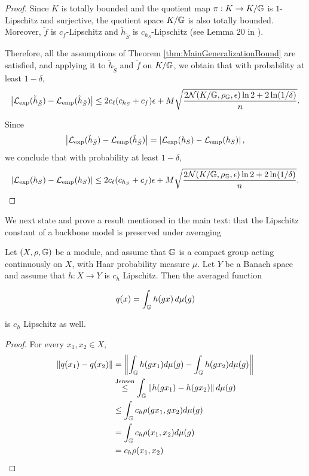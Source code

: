 \begin{proof}
Since $K$ is totally bounded and the quotient map
$\pi:K\to K/\mathbb{G}$ is $1$-Lipschitz and surjective, the quotient space
$K/\mathbb{G}$ is also totally bounded. Moreover, $\tilde{f}$ is
$c_f$-Lipschitz and $\tilde{h}_{\tilde S}$ is
$c_{h_S}$-Lipschitz (see Lemma 20 in
\cite{siegel2026quantitativeapproximationratesgroup}).

Therefore, all the assumptions of Theorem
\ref{thm:MainGeneralizationBound} are satisfied, and applying it to
$\tilde{h}_{\tilde S}$ and $\tilde{f}$ on $K/\mathbb{G}$, we obtain that with
probability at least $1-\delta$,
\begin{align*}
\left|
\mathcal{L}_{\mathrm{exp}}(\tilde{h}_{\tilde S})
-
\mathcal{L}_{\mathrm{emp}}(\tilde{h}_{\tilde S})
\right|
\leq
2c_\ell(c_{h_S}+c_f)\epsilon
+
M\sqrt{
\frac{
2\mathcal{N}(K/\mathbb{G},\rho_{\mathbb{G}},\epsilon)\ln 2
+
2\ln(1/\delta)
}{n}
}.
\end{align*}

Since
\[
\left|
\mathcal{L}_{\mathrm{exp}}(\tilde{h}_{\tilde S})
-
\mathcal{L}_{\mathrm{emp}}(\tilde{h}_{\tilde S})
\right|
=
\left|
\mathcal{L}_{\mathrm{exp}}(h_S)
-
\mathcal{L}_{\mathrm{emp}}(h_S)
\right|,
\]
we conclude that with probability at least $1-\delta$,
\begin{align*}
\left|
\mathcal{L}_{\mathrm{exp}}(h_S)
-
\mathcal{L}_{\mathrm{emp}}(h_S)
\right|
\leq
2c_\ell(c_{h_S}+c_f)\epsilon
+
M\sqrt{
\frac{
2\mathcal{N}(K/\mathbb{G},\rho_{\mathbb{G}},\epsilon)\ln 2
+
2\ln(1/\delta)
}{n}
}.
\end{align*}


\end{proof}


We next state and prove a result mentioned in the main text: that the Lipschitz constant of a backbone model is preserved under averaging
\begin{proposition}
\label{prop:Lavg}
Let $(X,\rho,\mathbb{G})$ be a module, and assume that $\mathbb{G}$ is a compact group acting continuously on $X$, with Haar probability measure $\mu$. Let $Y$ be a Banach space and assume that $h:X\to Y$ is $c_h$ Lipschitz. Then the averaged function

$$
q(x)=\int_{\mathbb{G}} h(gx)\,d\mu(g)
$$

is $c_h$ Lipschitz as well.
\end{proposition}

\begin{proof}
For every $x_1,x_2\in X$,
\begin{align*}
\|q(x_1)-q(x_2)\|&=\left\|\int_{\mathbb{G}} h(gx_1)d\mu(g)-\int_{\mathbb{G}} h(gx_2)d\mu(g) \right\|\\
&\stackrel{\text{Jensen}}{\leq} \int_{\mathbb{G}} \left\|h(gx_1)-h(gx_2) \right\|d\mu(g)\\
&\leq \int_{\mathbb{G}} c_h \rho(gx_1,gx_2) d\mu(g)\\
&=\int_{\mathbb{G}} c_h \rho(x_1,x_2) d\mu(g)\\
&=c_h\rho(x_1,x_2)
\end{align*}
\end{proof}

